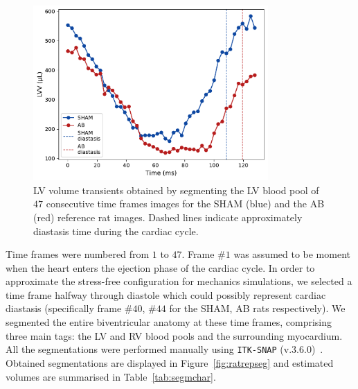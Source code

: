 \begin{figure}[!ht]
    \myfloatalign
    \includegraphics[width=0.8\textwidth]{figures/chapter04/lvv_experimental_transient.pdf}
    \caption{LV volume transients obtained by segmenting the LV blood pool of $47$ consecutive time frames images for the SHAM (blue) and the AB (red) reference rat images. Dashed lines indicate approximately diastasis time during the cardiac cycle.}
    \label{fig:lvvexptransients}
\end{figure}

\vspace{0.2cm}
Time frames were numbered from $1$ to $47$. Frame $\#1$ was assumed to be moment when the heart enters the ejection phase of the cardiac cycle. In order to approximate the stress-free configuration for mechanics simulations, we selected a time frame halfway through diastole which could possibly represent cardiac diastasis (specifically frame $\#40$, $\#44$ for the SHAM, AB rats respectively). We segmented the entire biventricular anatomy at these time frames, comprising three main tags: the LV and RV blood pools and the surrounding myocardium. All the segmentations were performed manually using \texttt{ITK-SNAP} (v.$3.6.0$)~\cite{Yushkevich:2006}. Obtained segmentations are displayed in Figure~\ref{fig:ratrepseg} and estimated volumes are summarised in Table~\ref{tab:segmchar}.

